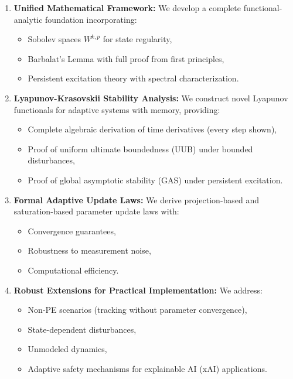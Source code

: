 \begin{enumerate}
    \item \textbf{Unified Mathematical Framework:} We develop a complete functional-analytic foundation incorporating:
    \begin{itemize}
        \item Sobolev spaces $W^{k,p}$ for state regularity,
        \item Barbalat's Lemma with full proof from first principles,
        \item Persistent excitation theory with spectral characterization.
    \end{itemize}

    \item \textbf{Lyapunov-Krasovskii Stability Analysis:} We construct novel Lyapunov functionals for adaptive systems with memory, providing:
    \begin{itemize}
        \item Complete algebraic derivation of time derivatives (every step shown),
        \item Proof of uniform ultimate boundedness (UUB) under bounded disturbances,
        \item Proof of global asymptotic stability (GAS) under persistent excitation.
    \end{itemize}

    \item \textbf{Formal Adaptive Update Laws:} We derive projection-based and saturation-based parameter update laws with:
    \begin{itemize}
        \item Convergence guarantees,
        \item Robustness to measurement noise,
        \item Computational efficiency.
    \end{itemize}

    \item \textbf{Robust Extensions for Practical Implementation:} We address:
    \begin{itemize}
        \item Non-PE scenarios (tracking without parameter convergence),
        \item State-dependent disturbances,
        \item Unmodeled dynamics,
        \item Adaptive safety mechanisms for explainable AI (xAI) applications.
    \end{itemize}


\end{enumerate}
